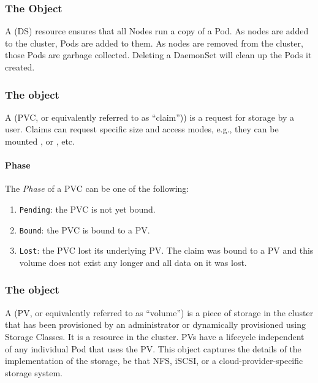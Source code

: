 \subsubsection{The  Object}
\label{section:daemone-set}

A  (DS) resource ensures that all Nodes run a copy of a Pod. As
nodes are added to the cluster, Pods are added to them. As nodes are removed
from the cluster, those Pods are garbage collected. Deleting a DaemonSet will
clean up the Pods it created.

\subsubsection{The  object}

A  (PVC, or equivalently referred to as ``claim'')) is
a request for storage by a user. Claims can request specific size and access
modes, e.g., they can be mounted ,  or
, etc.


\paragraph*{Phase}
The \textit{Phase} of a PVC can be one of the following:
\label{section:pvc-phase}
\begin{enumerate}
	\tightlist
	\item \texttt{Pending}: the PVC is not yet bound.
	\item \texttt{Bound}: the PVC is bound to a PV.
	\item \texttt{Lost}: the PVC lost its underlying PV. The claim was bound to
	      a  PV and this volume does not exist any longer and all data on it was
	      lost.
\end{enumerate}


\subsubsection{The  object}

A  (PV, or equivalently referred to as ``volume'') is a
piece of storage in the cluster that has been provisioned by an administrator or
dynamically provisioned using Storage Classes. It is a resource in the cluster.
PVs have a lifecycle independent of any individual Pod that uses the PV. This
 object captures the details of the implementation of the storage, be that
NFS, iSCSI, or a cloud-provider-specific storage system.

